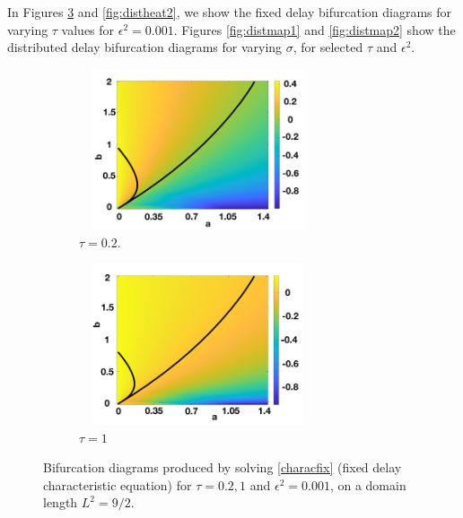 In Figures \ref{fig:distheat1} and \ref{fig:distheat2}, we show the fixed delay bifurcation diagrams for varying $\tau$ values for $\epsilon^2=0.001$. Figures \ref{fig:distmap1} and \ref{fig:distmap2} show the distributed delay bifurcation diagrams for varying $\sigma$, for selected $\tau$ and $\epsilon^2$.
\begin{figure}[H]
    \centering
    \begin{subfigure}[t]{0.45\textwidth}
        \centering
        \includegraphics[width=7cm,height=4.75cm]{t1f1.png}
        \caption{$\tau=0.2$.}
        \label{}
    \end{subfigure}
    \hfill
    \begin{subfigure}[t]{0.45\textwidth}
        \centering
        \includegraphics[width=7cm,height=4.75cm]{t2f1.png}
        \caption{$\tau=1$}
        \label{}
    \end{subfigure}
    \caption{Bifurcation diagrams produced by solving \eqref{characfix} (fixed delay characteristic equation) for $\tau=0.2,1$ and $\epsilon^2=0.001$, on a domain length $L^2=9/2$.}
    \label{fig:distheat1}
\end{figure}
